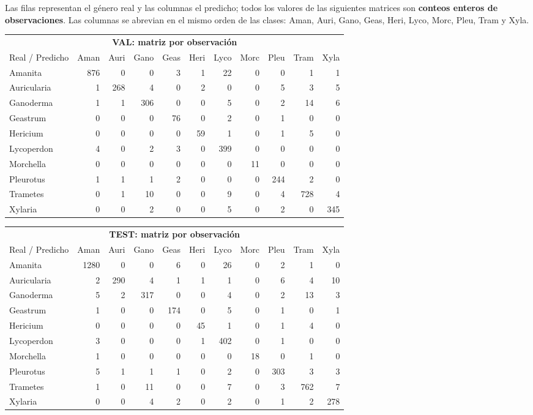 \documentclass[11pt,a4paper]{article}
\begin{document}
Las filas representan el género real y las columnas el predicho; todos
los valores de las siguientes matrices son \textbf{conteos enteros de observaciones}.
Las columnas se abrevian en el mismo orden de las clases: Aman, Auri,
Gano, Geas, Heri, Lyco, Morc, Pleu, Tram y Xyla.
\begin{center}\scriptsize
\setlength{\tabcolsep}{3pt}
\begin{tabular}{lrrrrrrrrrr}\toprule
\multicolumn{11}{c}{\textbf{VAL: matriz por observación}}\\
Real / Predicho & Aman & Auri & Gano & Geas & Heri & Lyco & Morc & Pleu & Tram & Xyla\\\midrule
Amanita & 876 & 0 & 0 & 3 & 1 & 22 & 0 & 0 & 1 & 1\\
Auricularia & 1 & 268 & 4 & 0 & 2 & 0 & 0 & 5 & 3 & 5\\
Ganoderma & 1 & 1 & 306 & 0 & 0 & 5 & 0 & 2 & 14 & 6\\
Geastrum & 0 & 0 & 0 & 76 & 0 & 2 & 0 & 1 & 0 & 0\\
Hericium & 0 & 0 & 0 & 0 & 59 & 1 & 0 & 1 & 5 & 0\\
Lycoperdon & 4 & 0 & 2 & 3 & 0 & 399 & 0 & 0 & 0 & 0\\
Morchella & 0 & 0 & 0 & 0 & 0 & 0 & 11 & 0 & 0 & 0\\
Pleurotus & 1 & 1 & 1 & 2 & 0 & 0 & 0 & 244 & 2 & 0\\
Trametes & 0 & 1 & 10 & 0 & 0 & 9 & 0 & 4 & 728 & 4\\
Xylaria & 0 & 0 & 2 & 0 & 0 & 5 & 0 & 2 & 0 & 345\\
\bottomrule\end{tabular}\end{center}
\begin{center}\scriptsize
\setlength{\tabcolsep}{3pt}
\begin{tabular}{lrrrrrrrrrr}\toprule
\multicolumn{11}{c}{\textbf{TEST: matriz por observación}}\\
Real / Predicho & Aman & Auri & Gano & Geas & Heri & Lyco & Morc & Pleu & Tram & Xyla\\\midrule
Amanita & 1280 & 0 & 0 & 6 & 0 & 26 & 0 & 2 & 1 & 0\\
Auricularia & 2 & 290 & 4 & 1 & 1 & 1 & 0 & 6 & 4 & 10\\
Ganoderma & 5 & 2 & 317 & 0 & 0 & 4 & 0 & 2 & 13 & 3\\
Geastrum & 1 & 0 & 0 & 174 & 0 & 5 & 0 & 1 & 0 & 1\\
Hericium & 0 & 0 & 0 & 0 & 45 & 1 & 0 & 1 & 4 & 0\\
Lycoperdon & 3 & 0 & 0 & 0 & 1 & 402 & 0 & 1 & 0 & 0\\
Morchella & 1 & 0 & 0 & 0 & 0 & 0 & 18 & 0 & 1 & 0\\
Pleurotus & 5 & 1 & 1 & 1 & 0 & 2 & 0 & 303 & 3 & 3\\
Trametes & 1 & 0 & 11 & 0 & 0 & 7 & 0 & 3 & 762 & 7\\
Xylaria & 0 & 0 & 4 & 2 & 0 & 2 & 0 & 1 & 2 & 278\\
\bottomrule\end{tabular}\end{center}
\end{document}
